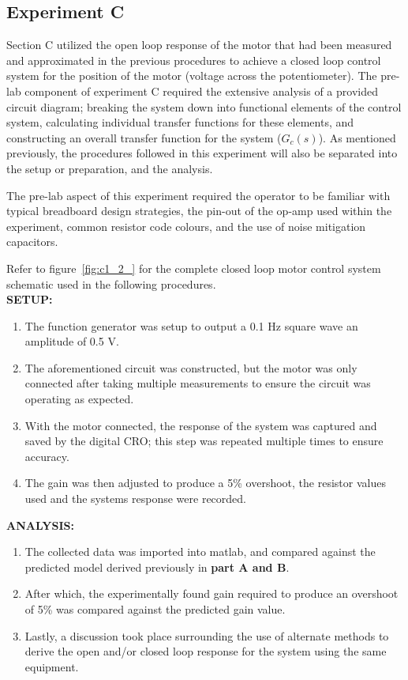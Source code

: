 \documentclass[11pt,a4paper]{article}
\begin{document}
\pagebreak
\subsection{Experiment C}
Section C utilized the open loop response of the motor that had been measured and approximated in the previous procedures to achieve a closed loop control system for the position of the motor (voltage across the potentiometer). The pre-lab component of experiment C required the extensive analysis of a provided circuit diagram; breaking the system down into functional elements of the control system, calculating individual transfer functions for these elements, and constructing an overall transfer function for the system ($G_c(s)$). As mentioned previously, the procedures followed in this experiment will also be separated into the setup or preparation, and the analysis. 

The pre-lab aspect of this experiment required the operator to be familiar with typical breadboard design strategies, the pin-out of the op-amp used within the experiment, common resistor code colours, and the use of noise mitigation capacitors. 

Refer to figure~\ref{fig:c1_2_} for the complete closed loop motor control system schematic used in the following procedures.\\

\textbf{SETUP:}
\begin{enumerate}
	\item The function generator was setup to output a 0.1 Hz square wave an amplitude of 0.5 V.
	\item The aforementioned circuit was constructed, but the motor was only connected after taking multiple measurements to ensure the circuit was operating as expected. 
	\item With the motor connected, the response of the system was captured and saved by the digital CRO; this step was repeated multiple times to ensure accuracy.
	\item The gain was then adjusted to produce a 5\% overshoot, the resistor values used and the systems response were recorded.
\end{enumerate} 

\textbf{ANALYSIS:}
\begin{enumerate}
	\item The collected data was imported into matlab, and compared against the predicted model derived previously in \textbf{part A and B}.
	\item After which, the experimentally found gain required to produce an overshoot of 5\% was compared against the predicted gain value. 
	\item Lastly, a discussion took place surrounding the use of alternate methods to derive the open and/or closed loop response for the system using the same equipment.
\end{enumerate}
\end{document}
